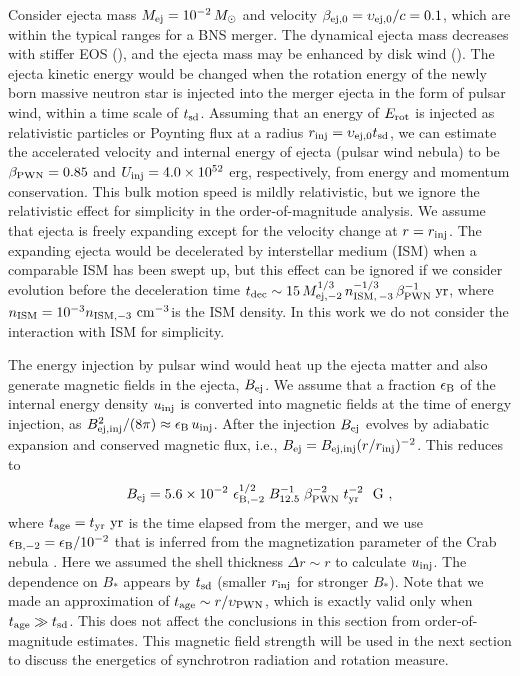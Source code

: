 \documentclass[]{pasj01}
\begin{document}
Consider ejecta mass $M_{\rm ej}
=10^{-2}\,M_{\odot}$ and velocity $\beta_{\rm ej,0}
= \upsilon_{\rm ej, 0} / c = 0.1$, which are within the typical ranges
for a BNS merger. The dynamical ejecta mass decreases with stiffer EOS
(\cite{Hotokezaka2013}), and the ejecta mass may be enhanced by disk
wind (\cite{Shibata2017a}). The ejecta kinetic energy would be changed
when the rotation energy of the newly born massive neutron star is
injected into the merger ejecta in the form of pulsar wind, within a
time scale of $t_{\rm sd}$. Assuming that an energy of $E_{\rm rot}$
is injected as relativistic particles or Poynting flux at a radius
$r_{\rm inj} = \upsilon_{\rm ej, 0} t_{\rm sd}$, we can estimate the
accelerated velocity and internal energy of ejecta (pulsar wind
nebula) to be $\beta_{\rm PWN} = 0.85$ and $U_{\rm
  inj}= 4.0\times10^{52}$ erg, respectively, from
energy and momentum conservation.  This bulk motion
  speed is mildly relativistic, but we ignore the relativistic effect
  for simplicity in the order-of-magnitude analysis.  We assume that
ejecta is freely expanding except for the velocity change at $r =
r_{\rm inj}$. The expanding ejecta would be decelerated by
interstellar medium (ISM) when a comparable ISM has been swept up, but
this effect can be ignored if we consider evolution before the
deceleration time $t_{\rm dec}\sim 15 \, M_{\rm ej,
    -2}^{1/3} \, n_{\rm ISM,\,-3}^{-1/3} \, \beta_{\rm PWN}^{-1} \;
  {\rm yr}$, where $n_{\rm ISM} = 10^{-3} n_{\rm ISM, -3} \ \rm
cm^{-3}$is the ISM density.  In this work we do not consider the interaction with ISM
for simplicity.

 The energy injection by pulsar wind would heat up
  the ejecta matter and also generate magnetic fields in the ejecta,
  $B_{\rm ej}$.  We assume that a fraction $\epsilon_{\rm B}$ of the
  internal energy density $u_{\rm inj}$ is converted into magnetic
  fields at the time of energy injection, as $B_{\rm ej, inj}^2
  /(8\pi)\approx \epsilon_{\rm B}\, u_{\rm inj}$.  After the injection
  $B_{\rm ej}$ evolves by adiabatic expansion and conserved
  magnetic flux, i.e., $B_{\rm ej} = B_{\rm ej, inj}(r/r_{\rm
    inj})^{-2}$.  This reduces to
\begin{eqnarray}
\label{eq:ejecta magnetic field}
B_{\rm ej}= 5.6 \times10^{-2} \ \epsilon_{{\rm B},-2}^{1/2} \;
B_{12.5}^{-1}\;\beta_{\rm PWN}^{-2}\;t_{\rm yr}^{-2}  \ \ {\rm G} \ ,
\end{eqnarray}
where $t_{\rm age} = t_{\rm yr} \rm \ yr$ is the time elapsed from the
merger, and we use $\epsilon_{\rm B,-2} = \epsilon_{\rm B}/10^{-2}$
that is inferred from the magnetization parameter of the Crab nebula
\citep{Kennel&Coroniti1984}. Here we assumed the shell thickness
$\Delta r \sim r$ to calculate $u_{\rm inj}$. The dependence on $B_*$
appears by $t_{\rm sd}$ (smaller $r_{\rm inj}$ for stronger $B_*$).
Note that we made an approximation of $t_{\rm age} \sim
r/\upsilon_{\rm PWN}$, which is exactly valid only when $t_{\rm age}
\gg t_{\rm sd}$.  This does not affect the conclusions in
this section from order-of-magnitude estimates.
This magnetic field strength will be used in the next section
to discuss the energetics of synchrotron radiation and rotation 
measure. 
\end{document}
